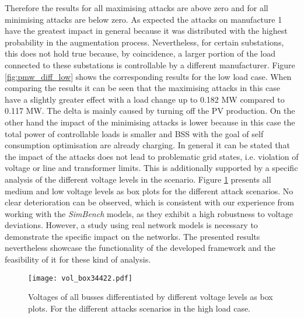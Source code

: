 Therefore the results for all maximising attacks are above zero and for all minimising attacks are below zero. As expected the attacks on manufacture 1 have the greatest impact in general because it was distributed with the highest probability in the augmentation process.
Nevertheless, for certain substations, this does not hold true because, by coincidence, a larger portion of the load connected to these substations is controllable by a different manufacturer.
Figure \ref{fig:pmw_diff_low} shows the corresponding results for the low load case. When comparing the results it can be seen that the maximising attacks in this case have a slightly greater effect with a load change up to 0.182 MW compared to 0.117 MW.
The delta is mainly caused by turning off the \ac{PV} production.
On the other hand the impact of the minimising attacks is lower because in this case the total power of controllable loads is smaller and \ac{BSS} with the goal of self consumption optimisation are already charging.
In general it can be stated that the impact of the attacks does not lead to problematic grid states, i.e. violation of voltage or line and transformer limits.
This is additionally supported by a specific analysis of the different voltage levels in the scenario.
Figure \ref{fig:box_high} presents all medium and low voltage levels as box plots for the different attack scenarios.
No clear deterioration can be observed, which is consistent with our experience from working with the \textit{SimBench} models, as they exhibit a high robustness to voltage deviations.
However, a study using real network models is necessary to demonstrate the specific impact on the networks.
The presented results nevertheless showcase the functionality of the developed framework and the feasibility of it for these kind of analysis.
\vspace*{-0.4cm} 
\begin{figure}[H]
	\centering
	\texttt{[image: vol\_box34422.pdf]}
	\caption{
		Voltages of all busses differentiated by different voltage levels as box plots. For the different attacks scenarios in the high load case.
	}
	\label{fig:box_high}
\end{figure}